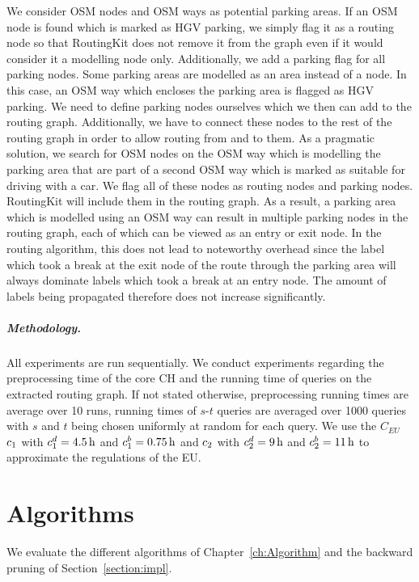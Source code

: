 We consider OSM nodes and OSM ways as potential parking areas. If an OSM node is found which is marked as HGV parking, we simply flag it as a routing node so that RoutingKit does not remove it from the graph even if it would consider it a modelling node only. Additionally, we add a parking flag for all parking nodes. Some parking areas are modelled as an area instead of a node. In this case, an OSM way which encloses the parking area is flagged as HGV parking. We need to define parking nodes ourselves which we then can add to the routing graph. Additionally, we have to connect these nodes to the rest of the routing graph in order to allow routing from and to them. As a pragmatic solution, we search for OSM nodes on the OSM way which is modelling the parking area that are part of a second OSM way which is marked as suitable for driving with a car. We flag all of these nodes as routing nodes and parking nodes. RoutingKit will include them in the routing graph. As a result, a parking area which is modelled using an OSM way can result in multiple parking nodes in the routing graph, each of which can be viewed as an entry or exit node. In the routing algorithm, this does not lead to noteworthy overhead since the label which took a break at the exit node of the route through the parking area will always dominate labels which took a break at an entry node. The amount of labels being propagated therefore does not increase significantly.


\subparagraph{Methodology.} All experiments are run sequentially. We conduct experiments regarding the preprocessing time of the core CH and the running time of queries on the extracted routing graph. If not stated otherwise, preprocessing running times are average over \num{10} runs, running times of $s$-$t$ queries are averaged over \num{1000} queries with $s$ and $t$ being chosen uniformly at random for each query. We use the $C_{EU}$ $c_1$ with $c_1^d = \SI{4.5}{\hour}$ and $c_1^b = \SI{0.75}{\hour}$ and $c_2$ with $c_2^d = \SI{9}{\hour}$ and $c_2^b = \SI{11}{\hour}$ to approximate the regulations of the EU.

\section{Algorithms}
We evaluate the different algorithms of Chapter~\ref{ch:Algorithm} and the backward pruning of Section~\ref{section:impl}.

